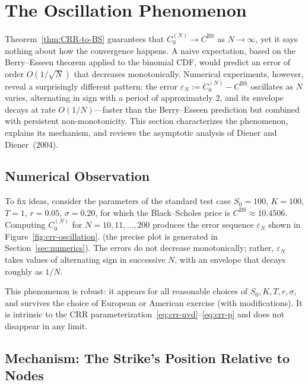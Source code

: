 \documentclass[11pt,a4paper]{article}
\theoremstyle{plain}
\theoremstyle{definition}
\begin{document}
\section{The Oscillation Phenomenon}
\label{sec:oscillation}

Theorem~\ref{thm:CRR-to-BS} guarantees that $C_0^{(N)} \to C^{\mathrm{BS}}$
as $N \to \infty$, yet it says nothing about how the convergence happens.
A naive expectation, based on the Berry--Esseen theorem applied to the
binomial CDF, would predict an error of order $O(1/\sqrt{N})$ that
decreases monotonically. Numerical experiments, however, reveal a
surprisingly different pattern: the error
$\varepsilon_N := C_0^{(N)} - C^{\mathrm{BS}}$ oscillates as $N$ varies,
alternating in sign with a period of approximately $2$, and its
envelope decays at rate $O(1/N)$---faster than the Berry--Esseen
prediction but combined with persistent non-monotonicity. This section
characterizes the phenomenon, explains its mechanism, and reviews the
asymptotic analysis of Diener and Diener~(2004).

\subsection{Numerical Observation}
\label{subsec:oscillation-numerics}

To fix ideas, consider the parameters of the standard test case
$S_0 = 100$, $K = 100$, $T = 1$, $r = 0.05$, $\sigma = 0.20$, for which
the Black--Scholes price is $C^{\mathrm{BS}} \approx 10.4506$. Computing
$C_0^{(N)}$ for $N = 10, 11, \dots, 200$ produces the error sequence
$\varepsilon_N$ shown in Figure~\ref{fig:crr-oscillation}. (the precise plot is
generated in Section~\ref{sec:numerics}). The errors do not decrease monotonically;
rather, $\varepsilon_N$ takes values of alternating sign in successive
$N$, with an envelope that decays roughly as $1/N$.

This phenomenon is robust: it appears for all reasonable choices of
$S_0, K, T, r, \sigma$, and survives the choice of European or American
exercise (with modifications). It is intrinsic to the CRR
parameterization~\eqref{eq:crr-uvd}--\eqref{eq:crr-p} and does not
disappear in any limit.

\subsection{Mechanism: The Strike's Position Relative to Nodes}
\label{subsec:oscillation-mechanism}
\end{document}
